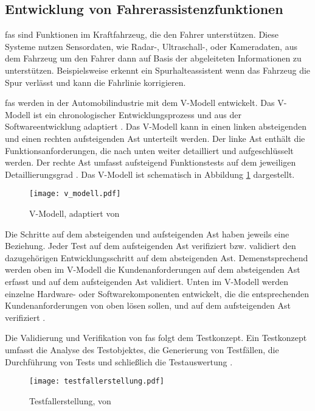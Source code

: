 \subsection{Entwicklung von Fahrerassistenzfunktionen}
\label{grundlagen_fahren_entwicklung}

\gls{fas} sind Funktionen im Kraftfahrzeug, die den Fahrer unterstützen. Diese Systeme nutzen Sensordaten, wie Radar-, Ultraschall-, oder Kameradaten, aus dem Fahrzeug um den Fahrer dann auf Basis der abgeleiteten Informationen zu unterstützen. Beispielsweise erkennt ein Spurhalteassistent wenn das Fahrzeug die Spur verlässt und kann die Fahrlinie korrigieren. 

\gls{fas} werden in der Automobilindustrie mit dem V-Modell entwickelt. Das V-Modell ist ein chronologischer Entwicklungsprozess und aus der Softwareentwicklung adaptiert \cite{vmodell2005}. Das V-Modell kann in einen linken absteigenden und einen rechten aufsteigenden Ast unterteilt werden. Der linke Ast enthält die Funktionsanforderungen, die nach unten weiter detailliert und aufgeschlüsselt werden. Der rechte Ast umfasst aufsteigend Funktionstests auf dem jeweiligen Detaillierungsgrad \cite{hakuli2015virtuelle}. Das V-Modell ist schematisch in Abbildung \ref{fig_v_modell} dargestellt.

\begin{figure}[h]
\centering
\texttt{[image: v\_modell.pdf]}
\caption{V-Modell, adaptiert von \cite{hakuli2015virtuelle}}
\label{fig_v_modell}
\end{figure}

Die Schritte auf dem absteigenden und aufsteigenden Ast haben jeweils eine Beziehung. Jeder Test auf dem aufsteigenden Ast verifiziert bzw. validiert den dazugehörigen Entwicklungsschritt auf dem absteigenden Ast. Demenstsprechend werden oben im V-Modell die Kundenanforderungen auf dem absteigenden Ast erfasst und auf dem aufsteigenden Ast validiert. Unten im V-Modell werden einzelne Hardware- oder Softwarekomponenten entwickelt, die die entsprechenden Kundenanforderungen von oben lösen sollen, und auf dem aufsteigenden Ast verifiziert \cite{hakuli2015virtuelle}.

Die Validierung und Verifikation von \gls{fas} folgt dem Testkonzept. Ein Testkonzept umfasst die Analyse des Testobjektes, die Generierung von Testfällen, die Durchführung von Tests und schließlich die Testauswertung \cite{schuldt2013effiziente}.

\begin{figure}[h]
\centering
\texttt{[image: testfallerstellung.pdf]}
\caption{Testfallerstellung, von \cite{schuldt2013effiziente}}
\label{fig_testfallerstellung}
\end{figure}

